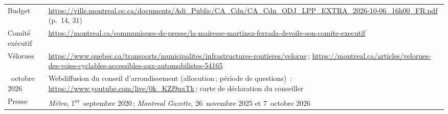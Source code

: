 \documentclass[11pt,letterpaper]{article}
\begin{document}
\begin{small}
\begin{longtable}{>{\raggedright\arraybackslash}p{4.2cm}>{\raggedright\arraybackslash}p{10.6cm}}
Budget & \url{https://ville.montreal.qc.ca/documents/Adi_Public/CA_Cdn/CA_Cdn_ODJ_LPP_EXTRA_2026-10-06_16h00_FR.pdf} (p.~14, 31) \\
Comité exécutif & \url{https://montreal.ca/communiques-de-presse/la-mairesse-martinez-ferrada-devoile-son-comite-executif} \\
Vélorues & \url{https://www.quebec.ca/transports/municipalites/infrastructures-routieres/velorue}\,; \url{https://montreal.ca/articles/velorues-des-voies-cyclables-accessibles-aux-automobilistes-54165} \\
6~octobre 2026 & Webdiffusion du conseil d'arrondissement (allocution\,; période de questions)~: \url{https://www.youtube.com/live/0k_KZf9uxTk}\,; carte de déclaration du conseiller \\
Presse & \emph{Métro}, 1\textsuperscript{er}~septembre 2020\,; \emph{Montreal Gazette}, 26~novembre 2025 et 7~octobre 2026 \\
\bottomrule
\end{longtable}
\end{small}
\end{document}
